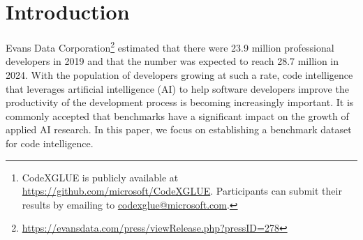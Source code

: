\documentclass[sigconf,nonacm,screen]{acmart}
\begin{document}
\author{Shujie Liu}



\renewcommand{\shortauthors}{Lu, Guo, Ren and Huang, et al.}

\begin{abstract}
Benchmark datasets have a significant impact on accelerating research in programming language tasks. 
In this paper, we introduce CodeXGLUE, a benchmark dataset to foster machine learning research for program understanding and generation. CodeXGLUE includes a collection of 10 tasks across 14 datasets and a platform for model evaluation and comparison. CodeXGLUE also features three baseline systems, including the BERT-style, GPT-style, and Encoder-Decoder models, to make it easy for researchers to use the platform.
The availability of such data and baselines can help the development and validation of new methods that can be applied to various program understanding and generation problems
\footnote{CodeXGLUE is publicly available at \url{https://github.com/microsoft/CodeXGLUE}. Participants can submit their results by emailing to \url{codexglue@microsoft.com}.}.
\end{abstract}







\maketitle

\section{Introduction}

Evans Data Corporation\footnote{\url{https://evansdata.com/press/viewRelease.php?pressID=278}} estimated that there were 23.9 million professional developers in 2019 and that the number was expected to reach 28.7 million in 2024. With the population of developers growing at such a rate, 
code intelligence that 
leverages artificial intelligence (AI) to help software developers improve the productivity of the development process is becoming increasingly important.
It is commonly accepted that 
benchmarks have a significant impact  on the growth of applied AI research.
In this paper, we focus on establishing a benchmark dataset for code intelligence.
\end{document}
